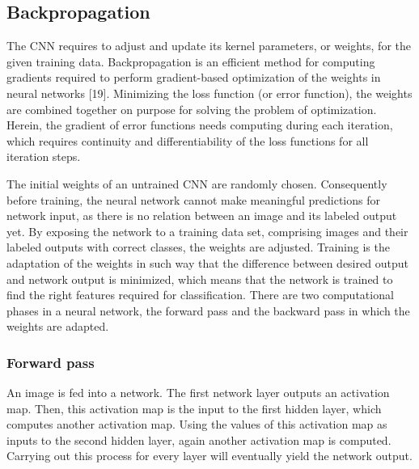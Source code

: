     \subsection{Backpropagation}
     The CNN requires to adjust and update its kernel parameters, or weights, for the given training data. Backpropagation\cite{werbos1990backpropagation} is an efficient method for computing gradients required to perform gradient-based optimization of the weights in neural networks [19]. Minimizing the loss function (or error function), the weights are combined together on purpose for solving the problem of optimization. Herein, the gradient of error functions needs computing during each iteration, which requires continuity and differentiability of the loss functions for all iteration steps.

    The initial weights of an untrained CNN are randomly chosen. Consequently before training, the neural network cannot make meaningful predictions for network input, as there is no relation between an image and its labeled output yet. By exposing the network to a training data set, comprising images and their labeled outputs with correct classes, the weights are adjusted. Training is the adaptation of the weights in such way that the difference between desired output and network output is minimized, which means that the network is trained to find the right features required for classification. There are two computational phases in a neural network, the forward pass and the backward pass in which the weights are adapted.

    \subsubsection{Forward pass}
    An image is fed into a network. The first network layer outputs an activation map. Then, this activation map is the input to the first hidden layer, which computes another activation map. Using the values of this activation map as inputs to the second hidden layer, again another activation map is computed. Carrying out this process for every layer will eventually yield the network output.

